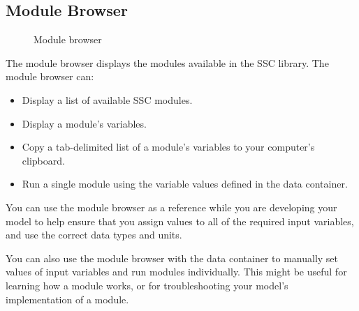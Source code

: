 \documentclass{scrartcl} %
\begin{document}
\subsection{Module Browser}
\label{sec_module_browser}

\begin{figure}
\begin{center}
\end{center}
\caption{Module browser}
\label{fig_module_browser}
\end{figure}

The module browser displays the modules available in the SSC library. The module browser can:

\begin{itemize}
\item Display a list of available SSC modules.
\item Display a module's variables.
\item Copy a tab-delimited list of a module's variables to your computer's clipboard.
\item Run a single module using the variable values defined in the data container.
\end{itemize}

You can use the module browser as a reference while you are developing your model to help ensure that you assign values to all of the required input variables, and use the correct data types and units.

You can also use the module browser with the data container to manually set values of input variables and run modules individually. This might be useful for learning how a module works, or for troubleshooting your model's implementation of a module.
\end{document}
